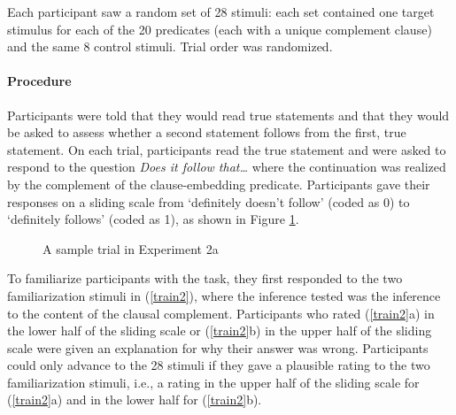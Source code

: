 \documentclass[11pt,fleqn]{article}
\newcommand{\6}{\mbox{$[\hspace*{-.6mm}[$}}
\newcommand{\9}{\mbox{$]\hspace*{-.6mm}]$}}
\begin{document}
Each participant saw a random set of 28 stimuli: each set contained one target stimulus for each of the 20 predicates (each with a unique complement clause) and the same 8 control stimuli. Trial order was randomized.

\paragraph{Procedure} Participants were told that they would read true statements and that they would be asked to assess whether a second statement follows from the first, true statement. On each trial, participants read the true statement and were asked to respond to the question {\em Does it follow that\ldots} where the continuation was realized by the complement of the clause-embedding predicate. Participants gave their responses on a sliding scale from `definitely doesn't follow' (coded as 0) to `definitely follows' (coded as 1), as shown in Figure \ref{f-trial-exp3}.

\begin{figure}[H]
\begin{center}
\end{center}
\caption{A sample trial in Experiment 2a}\label{f-trial-exp3}
\end{figure}

To familiarize participants with the task, they first responded to the two familiarization stimuli in (\ref{train2}), where the inference tested was the inference to the content of the clausal complement. Participants who rated (\ref{train2}a) in the lower half of the sliding scale or (\ref{train2}b) in the upper half of the sliding scale were given an explanation for why their answer was wrong. Participants could only advance to the 28 stimuli if they gave a plausible rating to the two familiarization stimuli, i.e., a rating in the upper half of the sliding scale for (\ref{train2}a) and in the lower half for (\ref{train2}b).
\end{document}
